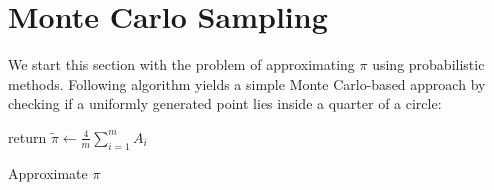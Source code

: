 \section{Monte Carlo Sampling}
We start this section with the problem of approximating $\pi$ using probabilistic methods.
Following algorithm yields a simple Monte Carlo-based approach by checking if a uniformly generated point
lies inside a quarter of a circle:
\newline
\begin{algorithm}[H]
    \label{algo:approx_pi_mc}
    \SetAlgoLined
    return $\tilde{\pi} \leftarrow \frac{4}{m}\sum_{i=1}^{m}A_i$
    \caption{Approximate $\pi$}
\end{algorithm}

